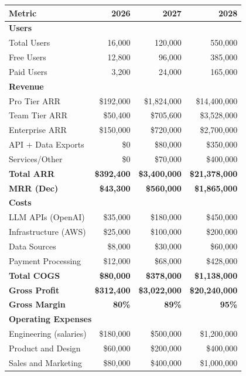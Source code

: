 \documentclass{report}
\begin{document}
\begin{table}[h]
\centering
\begin{tabular}{|l|r|r|r|}
\toprule
\textbf{Metric} & \textbf{2026} & \textbf{2027} & \textbf{2028} \\
\midrule
\multicolumn{4}{|l|}{\textbf{Users}} \\
Total Users & 16,000 & 120,000 & 550,000 \\
Free Users & 12,800 & 96,000 & 385,000 \\
Paid Users & 3,200 & 24,000 & 165,000 \\
\midrule
\multicolumn{4}{|l|}{\textbf{Revenue}} \\
Pro Tier ARR & \$192,000 & \$1,824,000 & \$14,400,000 \\
Team Tier ARR & \$50,400 & \$705,600 & \$3,528,000 \\
Enterprise ARR & \$150,000 & \$720,000 & \$2,700,000 \\
API + Data Exports & \$0 & \$80,000 & \$350,000 \\
Services/Other & \$0 & \$70,000 & \$400,000 \\
\midrule
\textbf{Total ARR} & \textbf{\$392,400} & \textbf{\$3,400,000} & \textbf{\$21,378,000} \\
\textbf{MRR (Dec)} & \textbf{\$43,300} & \textbf{\$560,000} & \textbf{\$1,865,000} \\
\midrule
\multicolumn{4}{|l|}{\textbf{Costs}} \\
LLM APIs (OpenAI) & \$35,000 & \$180,000 & \$450,000 \\
Infrastructure (AWS) & \$25,000 & \$100,000 & \$200,000 \\
Data Sources & \$8,000 & \$30,000 & \$60,000 \\
Payment Processing & \$12,000 & \$68,000 & \$428,000 \\
\midrule
\textbf{Total COGS} & \textbf{\$80,000} & \textbf{\$378,000} & \textbf{\$1,138,000} \\
\textbf{Gross Profit} & \textbf{\$312,400} & \textbf{\$3,022,000} & \textbf{\$20,240,000} \\
\textbf{Gross Margin} & \textbf{80\%} & \textbf{89\%} & \textbf{95\%} \\
\midrule
\multicolumn{4}{|l|}{\textbf{Operating Expenses}} \\
Engineering (salaries) & \$180,000 & \$500,000 & \$1,200,000 \\
Product and Design & \$60,000 & \$200,000 & \$400,000 \\
Sales and Marketing & \$80,000 & \$400,000 & \$1,000,000 \\

\end{tabular}
\end{table}
\end{document}
